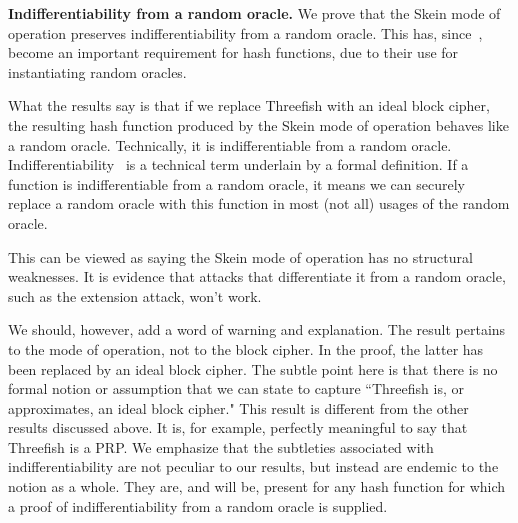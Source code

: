 \documentclass[11pt,twoside]{article}
\begin{document}

{\bf Indifferentiability from a random oracle.}  We prove that the Skein mode of operation preserves indifferentiability from a random oracle.  This has, since~\cite{C05,BR06}, become an important requirement for hash functions, due to their use for instantiating random oracles.

What the results say is that if we replace Threefish with an ideal block cipher, the resulting hash function produced by the Skein mode of operation behaves like a random oracle.  Technically, it is indifferentiable from a random oracle.  Indifferentiability~\cite{M04a,C05} is a technical term underlain by a formal definition.  If a function is indifferentiable from a random oracle, it means we can securely replace a random oracle with this function in most (not all) usages of the random oracle.

This can be viewed as saying the Skein mode of operation has no structural weaknesses.  It is evidence that attacks that differentiate it from a random oracle, such as the extension attack, won't work.

We should, however, add a word of warning and explanation. The result pertains to the mode of operation, not to the block cipher.  In the proof, the latter has been replaced by an ideal block cipher.  The subtle point here is that there is no formal notion or assumption that we can state to capture ``Threefish is, or approximates, an ideal block cipher."  This result is different from the other results discussed above.  It is, for example, perfectly meaningful to say that Threefish is a PRP. We emphasize that the subtleties associated with indifferentiability are not peculiar to our results, but instead are endemic to the notion as a whole.  They are, and will be, present for any hash function for which a proof of indifferentiability from a random oracle is supplied.
\end{document}
